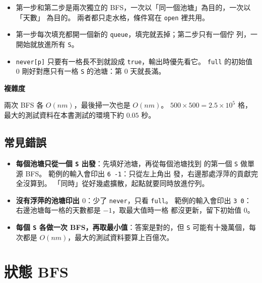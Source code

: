 
\begin{itemize}
\item 第一步和第二步是兩次獨立的 BFS，一次以「同一個池塘」為目的，一次以「天數」
為目的。 兩者都只走水格，條件寫在 \texttt{open} 裡共用。
\item 第一步每次填充都開一個新的 \texttt{queue}，填完就丟掉；第二步只有一個佇
列，一開始就放進所有 \texttt{S}。
\item \texttt{never[p]} 只要有一格長不到就設成 \texttt{true}，輸出時優先看它。
\texttt{full} 的初始值 $0$ 剛好對應只有一格 \texttt{S} 的池塘：第 $0$ 天就長滿。
\end{itemize}

\textbf{複雜度}

兩次 BFS 各 $O(nm)$，最後掃一次也是 $O(nm)$。 $500 \times 500 = 2.5 \times 10^5$
格，最大的測試資料在本書測試的環境下約 $0.05$ 秒。

\subsection{常見錯誤}

\begin{itemize}
\item \textbf{每個池塘只從一個 \texttt{S} 出發}：先填好池塘，再從每個池塘找到
的第一個 \texttt{S} 做單源 BFS。 範例的輸入會印出 \texttt{6 -1}：只從左上角出
發，右邊那處浮萍的貢獻完全沒算到。 「同時」從好幾處擴散，起點就要同時放進佇列。
\item \textbf{沒有浮萍的池塘印出 $0$}：少了 \texttt{never}，只看 \texttt{full}。
範例的輸入會印出 \texttt{3 0}：右邊池塘每一格的天數都是 $-1$，取最大值時一格
都沒更新，留下初始值 $0$。
\item \textbf{每個 \texttt{S} 各做一次 BFS，再取最小值}：答案是對的，但
\texttt{S} 可能有十幾萬個，每次都是 $O(nm)$，最大的測試資料要算上百億次。
\end{itemize}

\section{狀態 BFS}
\label{sec:state-bfs}


